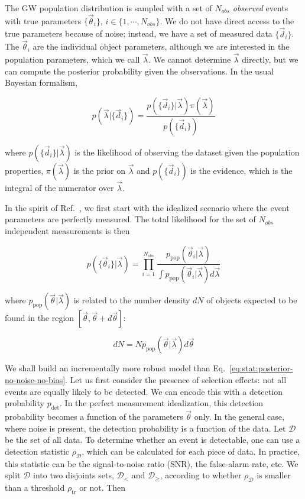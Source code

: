 \documentclass[%
preprint,
 amsmath,amssymb,
 aps,
]{revtex4-2}
\newcommand{\given}[2]{p( #1 | #2 )}
\newcommand{\ppop}[0]{p_{\text{pop}}}
\newcommand{\pdet}[0]{p_{\text{det}}}
\begin{document}
The GW population distribution is sampled with a set of $N_{obs}$ \textit{observed} events with
true parameters $\{ \vec{\theta}_i \}$, $i \in \{1, \cdots, N_{obs}\}$. We do not have direct
access to the true parameters because of noise; instead, we have a set of measured data $\{
	\vec{d}_i \}$. The $\vec{\theta}_i$ are the individual object parameters, although we are
interested in the population parameters, which we call $\vec{\lambda}$. We cannot determine
$\vec{\lambda}$ directly, but we can compute the posterior probability given the observations. In
the usual Bayesian formalism,

\begin{equation}
	\given{\vec{\lambda}}{\{\vec{d}_i \}} =
	\frac{\given{\{\vec{d}_i \}}{\vec{\lambda}} \pi(\vec{\lambda})}{p(\{\vec{d}_i \})}
\end{equation}

where $\given{\{\vec{d}_i \}}{\vec{\lambda}}$ is the likelihood of observing the dataset given the
population properties, $\pi(\vec{\lambda})$ is the prior on $\vec{\lambda}$ and $p(\{\vec{d}_i \})$
is the evidence, which is the integral of the numerator over $\vec{\lambda}$.

In the spirit of Ref.~, we first start with the idealized scenario where
the event parameters are perfectly measured. The total likelihood for the set of $N_{obs}$
independent measurements is then

\begin{equation}
	\label{eq:stat:posterior-no-noise-no-bias}
	\given{\{ \vec{\theta}_i \}}{\vec{\lambda}} =
	\prod_{i=1}^{N_{obs}} \frac{\ppop(\vec{\theta}_i | \vec{\lambda})}{\int \ppop(\vec{\theta}_i | \vec{\lambda}) d\vec{\lambda}}
\end{equation}

where $\ppop(\vec{\theta} | \vec{\lambda})$ is related to the number density $dN$ of objects
expected to be found in the region $[\vec{\theta}, \vec{\theta} + d\vec{\theta}]$:

\begin{equation}
	dN = N \ppop(\vec{\theta} | \vec{\lambda}) d\vec{\theta}
\end{equation}

We shall build an incrementally more robust model than
Eq.~\eqref{eq:stat:posterior-no-noise-no-bias}. Let us first consider the presence of selection
effects: not all events are equally likely to be detected. We can encode this with a detection
probability $\pdet$. In the perfect measurement idealization, this detection probability becomes a
function of the parameters $\vec{\theta}$ only. In the general case, where noise is present, the
detection probability is a function of the data. Let $\mathcal{D}$ be the set of all data. To
determine whether an event is detectable, one can use a detection statistic $\rho_{\mathcal{D}}$,
which can be calculated for each piece of data. In practice, this statistic can be the
signal-to-noise ratio (SNR), the false-alarm rate, etc. We split $\mathcal{D}$ into two disjoints
sets, $\mathcal{D}_<$ and $\mathcal{D}_\geq$, according to whether $\rho_\mathcal{D}$ is smaller
than a threshold $\rho_{\text{tr}}$ or not. Then
\end{document}
